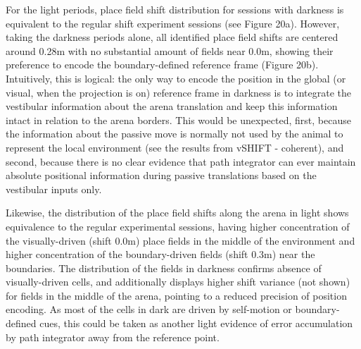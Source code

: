 For the light periods, place field shift distribution for sessions with darkness is equivalent to the regular shift experiment sessions (see Figure 20a). However, taking the darkness periods alone, all identified place field shifts are centered around 0.28m with no substantial amount of fields near 0.0m, showing their preference to encode the boundary-defined reference frame (Figure 20b). Intuitively, this is logical: the only way to encode the position in the global (or visual, when the projection is on) reference frame in darkness is to integrate the vestibular information about the arena translation and keep this information intact in relation to the arena borders. This would be unexpected, first, because the information about the passive move is normally not used by the animal to represent the local environment (see the results from vSHIFT - coherent), and second, because there is no clear evidence that path integrator can ever maintain absolute positional information during passive translations based on the vestibular inputs only.

Likewise, the distribution of the place field shifts along the arena in light shows equivalence to the regular experimental sessions, having higher concentration of the visually-driven (shift 0.0m) place fields in the middle of the environment and higher concentration of the boundary-driven fields (shift 0.3m) near the boundaries. The distribution of the fields in darkness confirms absence of visually-driven cells, and additionally displays higher shift variance (not shown) for fields in the middle of the arena, pointing to a reduced precision of position encoding. As most of the cells in dark are driven by self-motion or boundary-defined cues, this could be taken as another light evidence of error accumulation by path integrator away from the reference point.

